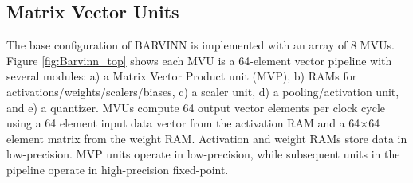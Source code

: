 \documentclass[sigconf]{acmart}
\newcommand{\MVU}{MVU}
\newcommand{\MatrixVectorUnit}{Matrix Vector Unit}
\newcommand{\barvinn}{BARVINN}
\begin{document}



\subsection{\MatrixVectorUnit{}s}
The base configuration of \barvinn{} is implemented with an array of 8 \MVU{}s. Figure \ref{fig:Barvinn_top} shows each \MVU{} is a 64-element vector pipeline with several modules: a) a Matrix Vector Product unit (MVP), b) RAMs for activations/weights/scalers/biases, c) a scaler unit, d) a pooling/activation unit, and e) a quantizer. \MVU{}s compute 64 output vector elements per clock cycle using a 64 element input data vector from the activation RAM and a 64$\times$64 element matrix from the weight RAM. Activation and weight RAMs store data in low-precision. MVP units operate in low-precision, while subsequent units in the pipeline operate in high-precision fixed-point.


\end{document}
